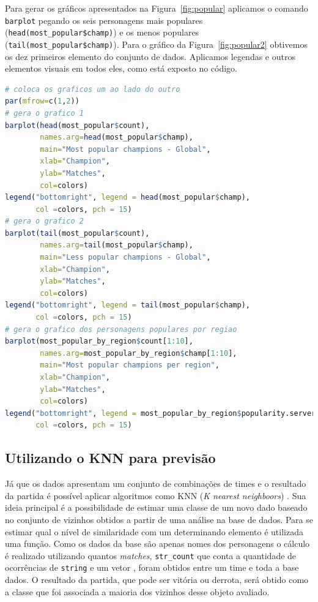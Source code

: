 \documentclass[a4paper]{article}
\begin{document}
Para gerar os gráficos apresentados na Figura~\ref{fig:popular} aplicamos o comando \texttt{barplot} pegando os seis personagens mais populares (\texttt{head(most\_popular\$champ)}) e os menos populares (\texttt{tail(most\_popular\$champ)}). Para o gráfico da Figura~\ref{fig:popular2} obtivemos os dez primeiros elemento do conjunto de dados. Aplicamos legendas e outros elementos visuais em todos eles, como está exposto no código. 

\begin{lstlisting}[language=R, caption={Gerando gráficos para mostrar visualmente a popularidade dos personagens},label={cod:mostpop}]
# coloca os graficos um ao lado do outro
par(mfrow=c(1,2))
# gera o grafico 1
barplot(head(most_popular$count), 
        names.arg=head(most_popular$champ), 
        main="Most popular champions - Global",
        xlab="Champion",
        ylab="Matches",
        col=colors)
legend("bottomright", legend = head(most_popular$champ),
       col =colors, pch = 15)
# gera o grafico 2
barplot(tail(most_popular$count), 
        names.arg=tail(most_popular$champ), 
        main="Less popular champions - Global",
        xlab="Champion",
        ylab="Matches",
        col=colors)
legend("bottomright", legend = tail(most_popular$champ),
       col =colors, pch = 15)
# gera o grafico dos personagens populares por regiao
barplot(most_popular_by_region$count[1:10], 
        names.arg=most_popular_by_region$champ[1:10], 
        main="Most popular champions per region",
        xlab="Champion",
        ylab="Matches",
        col=colors)
legend("bottomright", legend = most_popular_by_region$popularity.server[1:10],
       col =colors, pch = 15)
\end{lstlisting}



\subsection{Utilizando o KNN para previsão}

Já que os dados apresentam um conjunto de combinações de times e o resultado da partida é possível aplicar algoritmos como KNN (\textit{K nearest neighboors}) \cite{fukunaga1975branch}. Sua ideia principal é a possibilidade de estimar uma classe de um novo dado baseado no conjunto de vizinhos obtidos a partir de uma análise na base de dados. Para se estimar qual o nível de similaridade com um determinando elemento é utilizada uma função. Como os dados da base são apenas nomes dos personagens o cálculo é realizado utilizando quantos \textit{matches}, \texttt{str\_count} que conta a quantidade de ocorrências de \texttt{string} e um vetor , foram obtidos entre um time e toda a base dados. O resultado da partida, que pode ser vitória ou derrota, será obtido como a classe que foi associada a maioria dos vizinhos desse objeto avaliado. 
\end{document}
